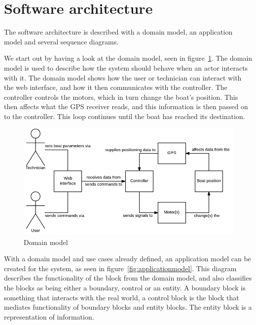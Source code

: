 \section{Software architecture}
The software architecture is described with a domain model, an application model and several sequence diagrams. 

We start out by having a look at the domain model, seen in figure~\ref{fig:domainmodel}. The domain model is used to describe how the system should behave when an actor interacts with it. The domain model shows how the user or technician can interact with the web interface, and how it then communicates with the controller. The controller controls the motors, which in turn change the boat's position. This then affects what the GPS receiver reads, and this information is then passed on to the controller. This loop continues until the boat has reached its destination.

\begin{figure}[H]
\centering
\includegraphics[width=1\linewidth]{../Appendix/Project/Dokumentation/Images/System_architecture/Domain_Model}
\caption{Domain model}
\label{fig:domainmodel}
\end{figure}

With a domain model and use cases already defined, an application model can be created for the system, as seen in figure~\ref{fig:applicationmodel}. This diagram describes the functionality of the block from the domain model, and also classifies the blocks as being either a boundary, control or an entity. A boundary block is something that interacts with the real world, a control block is the block that mediates functionality of boundary blocks and entity blocks. The entity block is a representation of information.

